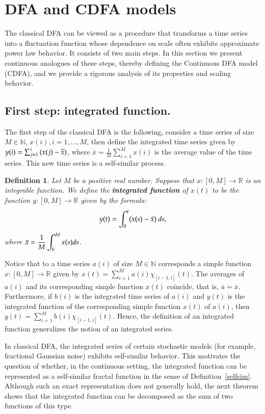 \documentclass{amsart}
\newtheorem{definition}[theorem]{Definition}
\newcommand{\R}{{\mathbb{R}}}
\newcommand{\N}{{\mathbb{N}}}
\begin{document}
\section{DFA and CDFA models}

The classical DFA can be viewed as a procedure that transforms a time series into a fluctuation function whose dependence on scale often exhibits approximate power law behavior. It consists of two main steps. In this section we present continuous analogues of these steps, thereby defining the Continuous DFA model (CDFA), and we provide a rigorous analysis of its properties and scaling behavior.



\subsection{First step: integrated function.}


The first step of the classical DFA is the following, consider a time series of size $M\in \N$, $x(i), i=1,\dots, M$, then define the integrated time series given by $y(i)=\sum_{j=1}^i\thinspace (x(j)-\overline{x})$, where $\overline{x}=\frac{1}{M}\sum_{i=1}^{M} x(i)$ is the average value of the time series. This new time series is a self-similar process.
\begin{definition}\label{IP}
Let $M$ be a positive real number. Suppose that $x:[0,M] \rightarrow \R$ is an integrable function. We define the \textbf{integrated function} of $x(t)$ to be the function $y\colon [0,M]\to \R$ given by the formula:
\begin{equation}\label{inte}
     y(t)=\int_{0}^{t} (x(s)-\Bar{x} )\ ds,
\end{equation}
where $\displaystyle \Bar{x} = \frac{1}{M} \int_{0}^{M} x(s) ds$.
\end{definition}
Notice that to a time series $a(i)$ of size $M\in \N$ corresponds a simple function $x:[0,M]\rightarrow \R$ given by $x(t)=\sum_{i=1}^M a(i)\chi_{[i-1,i]}(t)$. The averages of $a(i)$ and its corresponding simple function $x(t)$ coincide, that is, $\overline{a}=\overline{x}$. Furthermore, if $b(i)$ is the integrated time series of $a(i)$ and $y(t)$ is the integrated function of the corresponding simple function $x(t)$ of $a(i)$, then $y(t)=\sum_{i=1}^M b(i)\chi_{[i-1,i]}(t)$. Hence, the definition of an integrated function generalizes the notion of an integrated series.


In classical DFA, the integrated series of certain stochastic models (for example, fractional Gaussian noise) exhibits self-similar behavior. This motivates the question of whether, in the continuous setting, the integrated function can be represented as a self-similar fractal function in the sense of Definition~\ref{selfsim}.  Although such an exact representation does not generally hold, the next theorem shows that the integrated function can be decomposed as the sum of two functions of this type.
\end{document}
